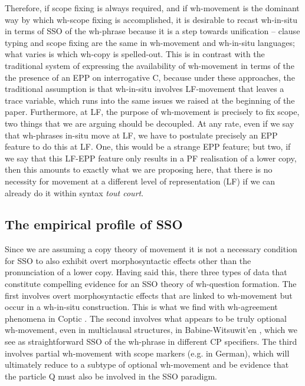 \documentclass[charis]{glossa}
\begin{document}
Therefore, if scope fixing is always required, and if wh-movement is the dominant way by which wh-scope fixing is accomplished, it is desirable to recast wh-in-situ in terms of SSO of the wh-phrase because it is a step towards unification -- clause typing and scope fixing are the same in wh-movement and wh-in-situ languages; what varies is which wh-copy is spelled-out. This is in contrast with the traditional system of expressing the availability of wh-movement in terms of the the presence of an EPP on interrogative C, because under these approaches, the traditional assumption is that wh-in-situ involves LF-movement that leaves a trace variable, which runs into the same issues we raised at the beginning of the paper. Furthermore, at LF, the purpose of wh-movement is precisely to fix scope, two things that we are arguing should be decoupled. At any rate, even if we say that wh-phrases in-situ move at LF, we have to postulate precisely an EPP feature to do this at LF. One, this would be a strange EPP feature; but two, if we say that this LF-EPP feature only results in a PF realisation of a lower copy, then this amounts to exactly what we are proposing here, that there is no necessity for movement at a different level of representation (LF) if we can already do it within syntax \textit{tout court}.


\subsection{The empirical profile of SSO}
Since we are assuming a copy theory of movement it is not a necessary condition for SSO to also exhibit overt morphosyntactic effects other than the pronunciation of a lower copy. Having said this, there three types of data that constitute compelling evidence for an SSO theory of wh-question formation. The first involves overt morphosyntactic effects that are linked to wh-movement but occur in a wh-in-situ construction.  This is what we find with wh-agreement phenomena in Coptic \citep{rlc:2006,reintges:2007}. The second involves what appears to be truly optional wh-movement, even in multiclausal structures, in Babine-Witsuwit'en \citep{denham:1997,denham:2000}, which we see as straightforward SSO of the wh-phrase in different CP specifiers. The third involves partial wh-movement with scope markers (e.g. in German), which will ultimately reduce to a subtype of optional wh-movement and be evidence that the particle Q must also be involved in the SSO paradigm.
\end{document}
